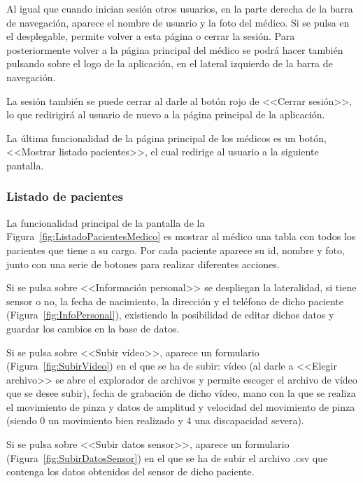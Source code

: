     Al igual que cuando inician sesión otros usuarios, en la parte derecha de la barra de navegación, aparece el nombre de usuario y la foto del médico. Si se pulsa en el desplegable, permite volver a esta página o cerrar la sesión. Para posteriormente volver a la página principal del médico se podrá hacer también pulsando sobre el logo de la aplicación, en el lateral izquierdo de la barra de navegación.

    La sesión también se puede cerrar al darle al botón rojo de <<Cerrar sesión>>, lo que redirigirá al usuario de nuevo a la página principal de la aplicación.

    La última funcionalidad de la página principal de los médicos es un botón, <<Mostrar listado pacientes>>, el cual redirige al usuario a la siguiente pantalla.
    
    \subsubsection{Listado de pacientes}
    La funcionalidad principal de la pantalla de la Figura~\ref{fig:ListadoPacientesMedico} es mostrar al médico una tabla con todos los pacientes que tiene a su cargo. Por cada paciente aparece su id, nombre y foto, junto con una serie de botones para realizar diferentes acciones.

    Si se pulsa sobre <<Información personal>> se despliegan la lateralidad, si tiene sensor o no, la fecha de nacimiento, la dirección y el teléfono de dicho paciente (Figura~\ref{fig:InfoPersonal}), existiendo la posibilidad de editar dichos datos y guardar los cambios en la base de datos.

    Si se pulsa sobre <<Subir vídeo>>, aparece un formulario (Figura~\ref{fig:SubirVideo}) en el que se ha de subir: vídeo (al darle a <<Elegir archivo>> se abre el explorador de archivos y permite escoger el archivo de vídeo que se desee subir), fecha de grabación de dicho vídeo, mano con la que se realiza el movimiento de pinza y datos de amplitud y velocidad del movimiento de pinza (siendo 0 un movimiento bien realizado y 4 una discapacidad severa).

    Si se pulsa sobre <<Subir datos sensor>>, aparece un formulario (Figura~\ref{fig:SubirDatosSensor}) en el que se ha de subir el archivo .csv que contenga los datos obtenidos del sensor de dicho paciente.

